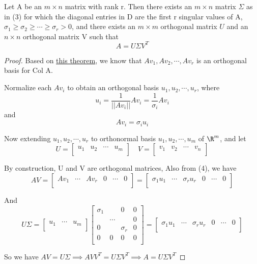 \begin{theorem}
    Let A be an \(m \times n\) matrix with rank r. 
    Then there exists an \(m \times n\) matrix \(\Sigma\) as in (3) for which the diagonal entries in D are the first r singular values of A, \(\sigma_1 \geq \sigma_2 \geq \cdots \geq \sigma_r > 0\), 
    and there exists an \(m \times m\) orthogonal matrix \(U\) and an \(n \times n\) orthogonal matrix V such that
    \[
        A = U \Sigma V^T
    \]      
\end{theorem}
\begin{proof}
    Based on \hyperref[theorem: 7.4.9]{this theorem}, we know that \({Av_1, Av_2, \cdots, Av_r}\) is an orthogonal basis for Col A.

    Normalize each \(Av_i\)  to obtain an orthogonal basis \({u_1, u_2, \cdots, u_r}\), where 
    \[
        u_i = \dfrac{1}{||Av_i||} Av_i = \dfrac{1}{\sigma_i} Av_i
    \]
    and 
    \[
        Av_i = \sigma_i u_i \tag{4}
    \]

    Now extending \(u_1, u_2, \cdots, u_r\) to orthonormal basis \({u_1, u_2, \cdots, u_m}\) of \(\R^m\), and let
    \[
        U = \begin{bmatrix}
            u_1 & u_2 & \cdots &  u_m \\
        \end{bmatrix}
        \quad
        V = \begin{bmatrix}
            v_1 & v_2 & \cdots &  v_n \\
        \end{bmatrix}
    \]  

    By construction, U and V are orthogonal matrices, Also from (4), we have 
    \[
        AV = \begin{bmatrix}
            Av_1 & \cdots & Av_r & 0 & \cdots &  0 \\
        \end{bmatrix}
        = \begin{bmatrix}
            \sigma_1u_1 & \cdots & \sigma_ru_r & 0 & \cdots &  0 \\
        \end{bmatrix}
    \]

    And
    \[
        U\Sigma = \begin{bmatrix}
            u_1 & \cdots &  u_m \\
        \end{bmatrix}
        \begin{bmatrix}
            \sigma_1 &  & 0 & 0  \\
             & \cdots &  & 0  \\
            0 &  & \sigma_r & 0  \\
            0 & 0 & 0 &  0 \\
        \end{bmatrix}
        = \begin{bmatrix}
            \sigma_1u_1 & \cdots & \sigma_ru_r & 0 & \cdots & 0 \\
        \end{bmatrix}
    \]

    So we have \(AV = U\Sigma \implies AVV^T = U\Sigma V^T \implies A = U\Sigma V^T\) 
\end{proof}

